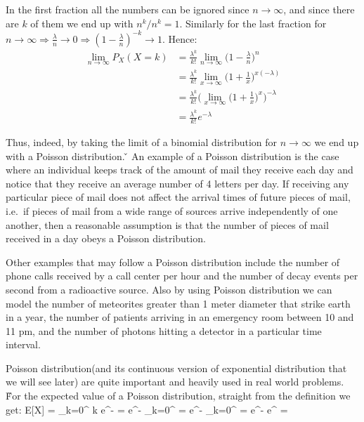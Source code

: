 In the first fraction all the numbers can be ignored since $n \to \infty$, and since there are $k$ of them we end up
with $n^k/n^k = 1$. Similarly for the last fraction for $n \to \infty \Rightarrow \frac{\lambda}{n} \to 0 \Rightarrow
(1-\frac{\lambda}{n})^{-k} \to 1$. Hence:
{\setlength{\jot}{10pt}
\begin{align*}
\lim_{n\to\infty} P_{X}(X=k) &= \frac{\lambda^k}{k!} \lim_{n\to\infty} \Big( 1-\frac{\lambda}{n} \Big)^{n}\\
&= \frac{\lambda^k}{k!} \lim_{x\to\infty} \Big( 1+\frac{1}{x} \Big)^{x(-\lambda)} \\
&= \frac{\lambda^k}{k!} \Big(\lim_{x\to\infty} \Big(1+\frac{1}{x}\Big)^{x}\Big)^{-\lambda} \\
&= \frac{\lambda^k}{k!} e^{-\lambda}
\end{align*}}

Thus, indeed, by taking the limit of a binomial distribution for $n \to \infty$ we end up with a Poisson distribution.
\v

\be
An example of a Poisson distribution is the case where an individual keeps track of the amount of mail they receive
each day and notice that they receive an average number of 4 letters per day. If receiving any particular piece of
mail does not affect the arrival times of future pieces of mail, i.e.\ if pieces of mail from a wide range of sources
arrive independently of one another, then a reasonable assumption is that the number of pieces of mail received in a
day obeys a Poisson distribution.
\ee

\be
Other examples that may follow a Poisson distribution include the number of phone calls received by a call center per
hour and the number of decay events per second from a radioactive source. Also by using Poisson distribution we can
model the number of meteorites greater than 1 meter diameter that strike earth in a year, the number of patients
arriving in an emergency room between 10 and 11 pm, and the number of photons hitting a detector in a particular time
interval.
\ee

Poisson distribution(and its continuous version of exponential distribution that we will see later) are quite
important and heavily used in real world problems. \v

For the expected value of a Poisson distribution, straight from the definition we get:
\bse
E[X] = \sum _{k=0}^{\infty} k e^{-\lambda} 
= e^{-\lambda} \sum _{k=0}^{\infty} = \lambda e^{-\lambda}
\sum _{k=0}^{\infty} = \lambda e^{-\lambda} e^{\lambda} = \lambda
\ese

